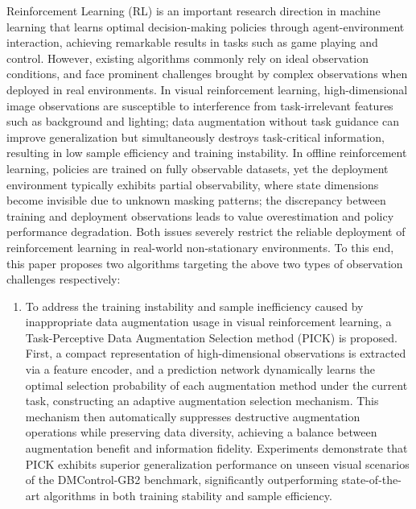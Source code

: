 \begin{englishabstract}

Reinforcement Learning (RL) is an important research direction in machine learning that learns optimal decision-making policies through agent-environment interaction, achieving remarkable results in tasks such as game playing and control. However, existing algorithms commonly rely on ideal observation conditions, and face prominent challenges brought by complex observations when deployed in real environments. In visual reinforcement learning, high-dimensional image observations are susceptible to interference from task-irrelevant features such as background and lighting; data augmentation without task guidance can improve generalization but simultaneously destroys task-critical information, resulting in low sample efficiency and training instability. In offline reinforcement learning, policies are trained on fully observable datasets, yet the deployment environment typically exhibits partial observability, where state dimensions become invisible due to unknown masking patterns; the discrepancy between training and deployment observations leads to value overestimation and policy performance degradation. Both issues severely restrict the reliable deployment of reinforcement learning in real-world non-stationary environments. To this end, this paper proposes two algorithms targeting the above two types of observation challenges respectively:

\begin{enumerate}[label=\arabic*)]
    \item To address the training instability and sample inefficiency caused by inappropriate data augmentation usage in visual reinforcement learning, a Task-Perceptive Data Augmentation Selection method (PICK) is proposed. First, a compact representation of high-dimensional observations is extracted via a feature encoder, and a prediction network dynamically learns the optimal selection probability of each augmentation method under the current task, constructing an adaptive augmentation selection mechanism. This mechanism then automatically suppresses destructive augmentation operations while preserving data diversity, achieving a balance between augmentation benefit and information fidelity. Experiments demonstrate that PICK exhibits superior generalization performance on unseen visual scenarios of the DMControl-GB2 benchmark, significantly outperforming state-of-the-art algorithms in both training stability and sample efficiency.


\end{enumerate}
\end{englishabstract}
